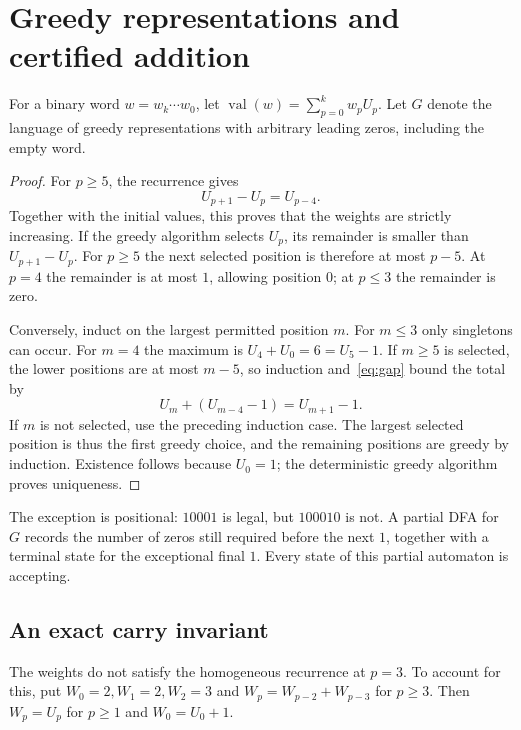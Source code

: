 \documentclass[11pt,a4paper]{article}
\numberwithin{equation}{section}
\newtheorem{lemma}[theorem]{Lemma}
\theoremstyle{remark}
\newcommand{\val}{\operatorname{val}}
\begin{document}
\section{Greedy representations and certified addition}\label{sec:arithmetic}
For a binary word $w=w_k\cdots w_0$, let
$\val(w)=\sum_{p=0}^k w_pU_p$. Let $G$ denote the language of greedy
representations with arbitrary leading zeros, including the empty word.

\begin{proof}
For $p\ge5$, the recurrence gives
\begin{equation}\label{eq:gap}
 U_{p+1}-U_p=U_{p-4}.
\end{equation}
Together with the initial values, this proves that the weights are strictly
increasing. If the greedy algorithm selects $U_p$, its remainder is smaller
than $U_{p+1}-U_p$. For $p\ge5$ the next selected position is therefore at
most $p-5$. At $p=4$ the remainder is at most $1$, allowing position $0$;
at $p\le3$ the remainder is zero.

Conversely, induct on the largest permitted position $m$. For $m\le3$ only
singletons can occur. For $m=4$ the maximum is $U_4+U_0=6=U_5-1$.
If $m\ge5$ is selected, the lower positions are at most $m-5$, so induction
and~\eqref{eq:gap} bound the total by
\[
 U_m+(U_{m-4}-1)=U_{m+1}-1.
\]
If $m$ is not selected, use the preceding induction case. The largest
selected position is thus the first greedy choice, and the remaining
positions are greedy by induction. Existence follows because $U_0=1$;
the deterministic greedy algorithm proves uniqueness.
\end{proof}

The exception is positional: $10001$ is legal, but $100010$ is not. A
partial DFA for $G$ records the number of zeros still required before the
next $1$, together with a terminal state for the exceptional final $1$.
Every state of this partial automaton is accepting.

\subsection{An exact carry invariant}
The weights do not satisfy the homogeneous recurrence at $p=3$.
To account for this, put $W_0=2,W_1=2,W_2=3$ and
$W_p=W_{p-2}+W_{p-3}$ for $p\ge3$. Then
$W_p=U_p$ for $p\ge1$ and $W_0=U_0+1$.
\end{document}
